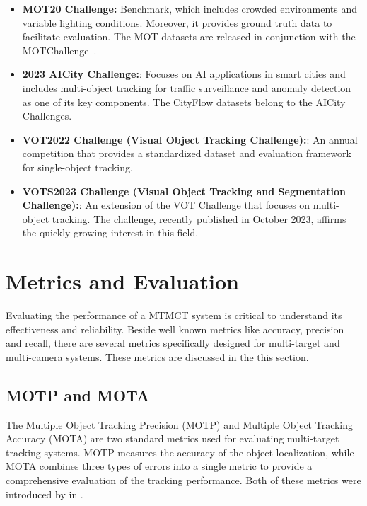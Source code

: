 \begin{itemize}
    \item \textbf{MOT20 Challenge:} Benchmark, which includes crowded environments and variable lighting conditions. Moreover, it provides ground truth data to facilitate evaluation. The MOT datasets are released in conjunction with the MOTChallenge~\cite{Dendorfer20}.
    \item \textbf{2023 AICity Challenge:}: Focuses on AI applications in smart cities and includes multi-object tracking for traffic surveillance and anomaly detection as one of its key components. The CityFlow datasets belong to the AICity Challenges.~\cite{Naphade23}
    \item \textbf{VOT2022 Challenge (Visual Object Tracking Challenge):}: An annual competition that provides a standardized dataset and evaluation framework for single-object tracking.~\cite{Kristan22}
    \item \textbf{VOTS2023 Challenge (Visual Object Tracking and Segmentation Challenge):}: An extension of the VOT Challenge that focuses on multi-object tracking. The challenge, recently published in October 2023, affirms the quickly growing interest in this field.~\cite{Kristan23}
\end{itemize}

\section{Metrics and Evaluation}\label{sec:metrics_and_evaluation}
Evaluating the performance of a MTMCT system is critical to understand its effectiveness and reliability. Beside well known metrics like accuracy, precision and recall, there are several metrics specifically designed for multi-target and multi-camera systems. These metrics are discussed in the this section.

\subsection{MOTP and MOTA}\label{subsec:motp_mota}
The Multiple Object Tracking Precision (MOTP) and Multiple Object Tracking Accuracy (MOTA) are two standard metrics used for evaluating multi-target tracking systems. MOTP measures the accuracy of the object localization, while MOTA combines three types of errors into a single metric to provide a comprehensive evaluation of the tracking performance. Both of these metrics were introduced by \textcite{Bernardin08} in \citeyear{Bernardin08}.

